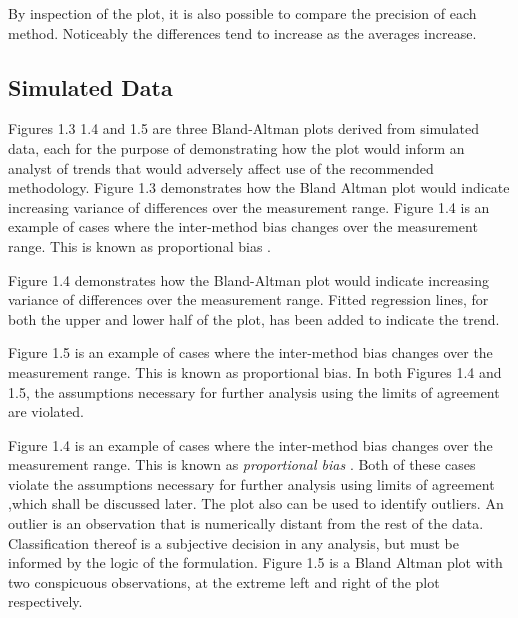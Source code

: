 \documentclass[Main.tex]{subfiles}
\begin{document}
	By inspection of the plot, it is also possible to compare the precision of each method. Noticeably the differences tend to
	increase as the averages increase.
	
 	\subsection{Simulated Data}

Figures 1.3 1.4 and 1.5 are three Bland-Altman plots derived from
	simulated data, each for the purpose of demonstrating how the plot
	would inform an analyst of trends that would adversely affect use
	of the recommended methodology. Figure 1.3 demonstrates how the
	Bland Altman plot would indicate increasing variance of
	differences over the measurement range. Figure 1.4 is an example
	of cases where the inter-method bias changes over the measurement
	range. This is known as proportional bias \citep{ludbrook97}.


	
	Figure 1.4 demonstrates how the Bland-Altman plot would indicate
	increasing variance of differences over the measurement range.
	Fitted regression lines, for both the upper and lower half of the
	plot, has been added to indicate the trend. 
	
Figure 1.5 is an
	example of cases where the inter-method bias changes over the
	measurement range. This is known as proportional bias. In both
	Figures 1.4 and 1.5, the assumptions necessary for further
	analysis using the limits of agreement are violated.	
	
Figure 1.4 is an example of cases where the inter-method bias
	changes over the measurement range. This is known as\textit{ proportional
		bias} \citet{ludbrook}. Both of these cases violate the assumptions
	necessary for further analysis using limits of agreement ,which
	shall be discussed later. The plot also can be used to identify
	outliers. An outlier is an observation that is numerically distant
	from the rest of the data. Classification thereof is a subjective
	decision in any analysis, but must be informed by the logic of the
	formulation. Figure 1.5 is a Bland Altman plot with two
	conspicuous observations, at the extreme left and right of the
	plot respectively.
	
	
	
\end{document}
